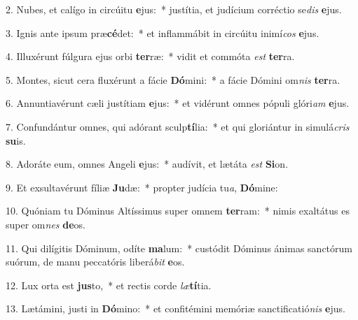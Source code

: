 2. Nubes, et calígo in circúitu \textbf{e}jus:~*  justítia, et judícium corréctio se\textit{dis} \textbf{e}jus.\

3. Ignis ante ipsum præ\textbf{cé}det:~*  et inflammábit in circúitu inimí\textit{cos} \textbf{e}jus.\

4. Illuxérunt fúlgura ejus orbi \textbf{ter}ræ:~*  vidit et commóta \textit{est} \textbf{ter}ra.\

5. Montes, sicut cera fluxérunt a fácie \textbf{Dó}mini:~*  a fácie Dómini om\textit{nis} \textbf{ter}ra.\

6. Annuntiavérunt cæli justítiam \textbf{e}jus:~*  et vidérunt omnes pópuli glóri\textit{am} \textbf{e}jus.\

7. Confundántur omnes, qui adórant sculp\textbf{tí}lia:~*  et qui gloriántur in simulá\textit{cris} \textbf{su}is.\

8. Adoráte eum, omnes Angeli \textbf{e}jus:~*  audívit, et lætáta \textit{est} \textbf{Si}on.\

9. Et exsultavérunt fíliæ \textbf{Ju}dæ:~*  propter judícia tu\textit{a}, \textbf{Dó}mine:\

10. Quóniam tu Dóminus Altíssimus super omnem \textbf{ter}ram:~*  nimis exaltátus es super om\textit{nes} \textbf{de}os.\

11. Qui dilígitis Dóminum, odíte \textbf{ma}lum:~*  custódit Dóminus ánimas sanctórum suórum, de manu peccatóris liberá\textit{bit} \textbf{e}os.\

12. Lux orta est \textbf{jus}to,~*  et rectis corde \textit{læ}\textbf{tí}tia.\

13. Lætámini, justi in \textbf{Dó}mino:~*  et confitémini memóriæ sanctificatió\textit{nis} \textbf{e}jus.\


